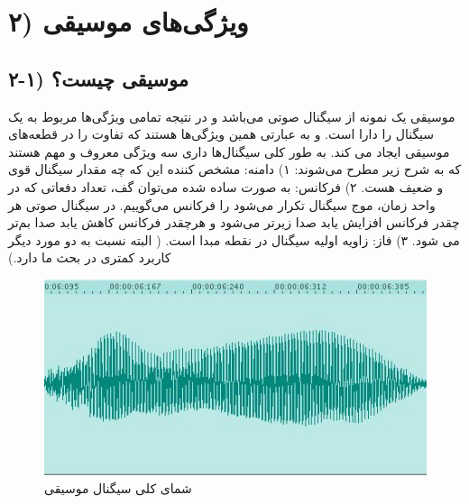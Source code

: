 \documentclass{article}
\begin{document}
\section{۲) ویژگی‌های موسیقی}
\subsection{۲-۱) موسیقی چیست؟}
موسیقی یک  نمونه از سیگنال صوتی می‌باشد و در نتیجه تمامی ویژگی‌ها مربوط به یک سیگنال را دارا است. و به عبارتی همین ویژگی‌ها هستند که تفاوت را در قطعه‌های موسیقی ایجاد می کند.
\newline
به طور کلی سیگنال‌ها داری سه ویژگی معروف و مهم هستند که به شرح زیر مطرح می‌شوند:\newline
۱) دامنه:
مشخص کننده این که چه مقدار سیگنال قوی و ضعیف هست.\newline
۲) فرکانس:
به صورت ساده شده می‌توان گف، تعداد دفعاتی که در واحد زمان، موج سیگنال تکرار می‌شود را فرکانس می‌گوییم. در سیگنال صوتی هر چقدر فرکانس افزایش یابد صدا زیرتر می‌شود و هرچقدر فرکانس کاهش یابد صدا بم‌تر می شود.\newline
۳) فاز:
زاویه اولیه سیگنال در نقطه مبدا است. ( البته نسبت به دو مورد دیگر کاربرد کمتری در بحث ما دارد.)\newline
\begin{figure}[h]
	\centering
	\includegraphics[width=0.5\linewidth]{Photo/1}
	\caption[شمای کلی سیگنال موسیقی]{شمای کلی سیگنال موسیقی}
	\label{fig:1}
\end{figure}
\end{document}
